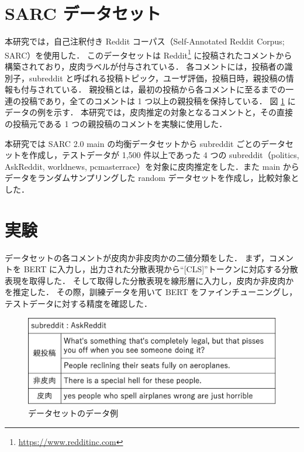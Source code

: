 \documentclass[a4paper,twoside,twocolumn,10pt]{article}
\begin{document}
\section{SARC データセット}
本研究では，自己注釈付き Reddit コーパス（Self-Annotated Reddit Corpus; SARC）を使用した．
このデータセットは Reddit\footnote{\url{https://www.redditinc.com}} に投稿されたコメントから構築されており，皮肉ラベルが付与されている．
各コメントには，投稿者の識別子，subreddit と呼ばれる投稿トピック，ユーザ評価，投稿日時，親投稿の情報も付与されている．
親投稿とは，最初の投稿から各コメントに至るまでの一連の投稿であり，全てのコメントは 1 つ以上の親投稿を保持している．
図 \ref{fig:1_data_example} にデータの例を示す．
本研究では，皮肉推定の対象となるコメントと，その直接の投稿元である 1 つの親投稿のコメントを実験に使用した．\par
本研究では SARC 2.0 main の均衡データセットから subreddit ごとのデータセットを作成し，テストデータが 1,500 件以上であった 4 つの subreddit（politics, AskReddit, worldnews, pcmasterrace）を対象に皮肉推定をした．また main からデータをランダムサンプリングした random データセットを作成し，比較対象とした． \par



\section{実験}
データセットの各コメントが皮肉か非皮肉かの二値分類をした．
まず，コメントを BERT に入力し，出力された分散表現から“[CLS]”トークンに対応する分散表現を取得した．
そして取得した分散表現を線形層に入力し，皮肉か非皮肉かを推定した．
その際，訓練データを用いて BERT をファインチューニングし，テストデータに対する精度を確認した．

\begin{figure}[tb]
  \centering
  \includegraphics[width=.8\hsize]{data_sample.eps}
  \caption{データセットのデータ例}
  \label{fig:1_data_example}
\end{figure}
 
\end{document}
